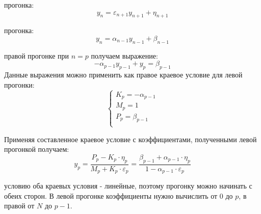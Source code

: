 \begin{enumerate}
 прогонка:
\begin{equation}
	y_n = \varepsilon_{n+1} y_{n+1} + \eta_{n+1}
\end{equation}

 прогонка:
\begin{equation}
	y_n = \alpha_{n-1} y_{n-1} + \beta_{n-1}
\end{equation}

 правой прогонке при $n = p$ получаем выражение: 
\begin{equation}
	-\alpha_{p - 1}y_{p - 1} + y_p = \beta_{p - 1}
\end{equation}
Данные выражения можно применить как правое краевое условие для левой прогонки: 
	\begin{equation*}
	\begin{cases}
		K_p = - \alpha_{p - 1} \\ 
		M_p = 1\\
		P_p = \beta_{p - 1}\\
	\end{cases}
\end{equation*}

Применяя составленное краевое условие с коэффициентами, полученными левой прогонкой получаем:
\begin{equation}
	y_p = \frac{P_p - K_p \cdot \eta_p}{M_p + K_p \cdot \varepsilon_p} = \frac{\beta_{p - 1} + \alpha_{p - 1} \cdot \eta_p}{1 - \alpha_{p - 1} \cdot \varepsilon_p}
\end{equation}

 условию оба краевых условия - линейные, поэтому прогонку можно начинать с обеих сторон. В левой прогонке коэффициенты нужно вычислить от 0 до $p$, в правой от $N$ до $p - 1$.

\end{enumerate}








